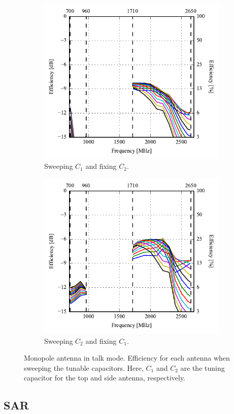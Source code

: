 \begin{figure}[htbp]
    \centering
    \begin{subfigure}{0.49\linewidth}
        \includegraphics{img/tech_sol/monopole/talk_mode/efficiency-ac1-csh1}
        \caption{Sweeping $C_1$ and fixing $C_2$.}
    \end{subfigure}
    \hfill
    \begin{subfigure}{0.49\linewidth}
        \includegraphics{img/tech_sol/monopole/talk_mode/efficiency-ac2-csh2}
        \caption{Sweeping $C_2$ and fixing $C_1$.}
    \end{subfigure}
    \caption{Monopole antenna in talk mode. Efficiency for each antenna when sweeping the tunable capacitors. Here, $C_1$ and $C_2$ are the tuning capacitor for the top and side antenna, respectively.}
    \label{fig:eff_sol1_read}
\end{figure}

\subsection{SAR}

